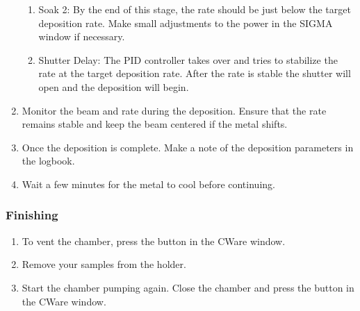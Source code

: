 \begin{enumerate}[resume]
\begin{enumerate}
  \item Soak 2: By the end of this stage, the rate should be just below the target deposition rate. Make small adjustments to the power in the SIGMA window if necessary.
  \item Shutter Delay: The PID controller takes over and tries to stabilize the rate at the target deposition rate. After the rate is stable the shutter will open and the deposition will begin.
\end{enumerate}
\item Monitor the beam and rate during the deposition. Ensure that the rate remains stable and keep the beam centered if the metal shifts.
\item Once the deposition is complete. Make a note of the deposition parameters in the logbook.
\item Wait a few minutes for the metal to cool before continuing.
\end{enumerate}
\subsubsection{Finishing}
\begin{enumerate}[resume]
\item To vent the chamber, press the  button in the CWare window.
\item Remove your samples from the holder.
\item Start the chamber pumping again. Close the chamber and press the  button in the CWare window.
\end{enumerate}
